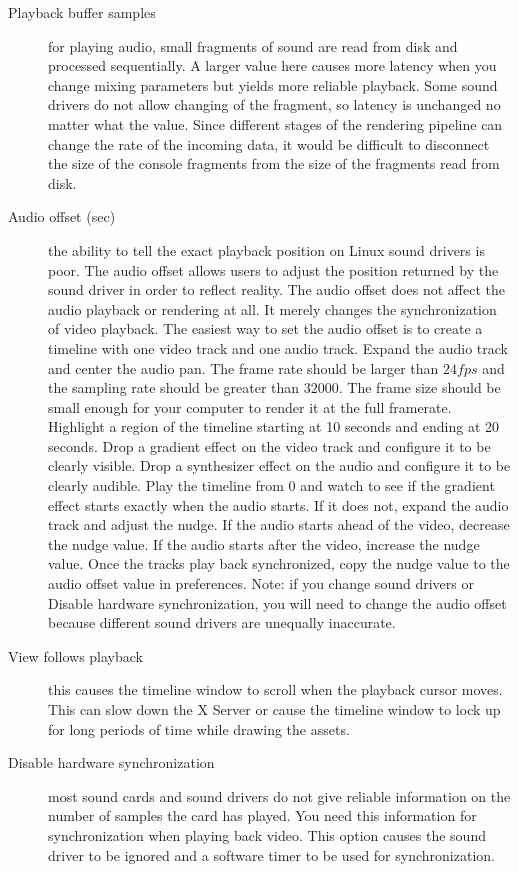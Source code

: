\begin{description}
    \item[Playback buffer samples]  for playing audio, small fragments of sound are read from disk and processed sequentially. A larger value here causes more latency when you change mixing parameters but yields more reliable playback.  Some sound drivers do not allow changing of the fragment, so latency is unchanged no matter what the value. Since different stages of the rendering pipeline can change the rate of the incoming data, it would be difficult to disconnect the size of the console fragments from the size of the fragments read from disk.
    \item[Audio offset (sec)]  the ability to tell the exact playback position on Linux sound drivers is poor.  The audio offset allows users to adjust the position returned by the sound driver in order to reflect reality. The audio offset does not affect the audio playback or rendering at all. It merely changes the synchronization of video playback. The easiest way to set the audio offset is to create a timeline with one video track and one audio track. Expand the audio track and center the audio pan. The frame rate should be larger than $24 fps$ and the sampling rate should be greater than $32000$. The frame size should be small enough for your computer to render it at the full framerate. Highlight a region of the timeline starting at 10 seconds and ending at 20 seconds. Drop a gradient effect on the video track and configure it to be clearly visible. Drop a synthesizer effect on the audio and configure it to be clearly audible. Play the timeline from 0 and watch to see if the gradient effect starts exactly when the audio starts. If it does not, expand the audio track and adjust the nudge. If the audio starts ahead of the video, decrease the nudge value. If the audio starts after the video, increase the nudge value. Once the tracks play back synchronized, copy the nudge value to the audio offset value in preferences. Note: if you change sound drivers or Disable hardware synchronization, you will need to change the audio offset because different sound drivers are unequally inaccurate.
    \item[View follows playback]  this causes the timeline window to scroll when the playback cursor moves. This can slow down the X Server or cause the timeline window to lock up for long periods of time while drawing the assets.
    \item[Disable hardware synchronization]  most sound cards and sound drivers do not give reliable information on the number of samples the card has played. You need this information for synchronization when playing back video. This option causes the sound driver to be ignored and a software timer to be used for synchronization.

\end{description}

